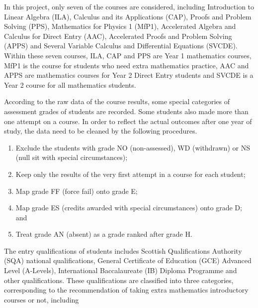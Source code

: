 \documentclass[a4paper]{report}
\begin{document}
In this project, only seven of the courses are considered, including Introduction to Linear Algebra (ILA), Calculus and its Applications (CAP), Proofs and Problem Solving (PPS), Mathematics for Physics 1 (MfP1), Accelerated Algebra and Calculus for Direct Entry (AAC), Accelerated Proofs and Problem Solving (APPS) and Several Variable Calculus and Differential Equations (SVCDE). Within these seven courses, ILA, CAP and PPS are Year 1 mathematics courses, MfP1 is the course for students who need extra mathematics practice, AAC and APPS are mathematics courses for Year 2 Direct Entry students and SVCDE is a Year 2 course for all mathematics students. 

According to the raw data of the course results, some special categories of assessment grades of students are recorded. Some students also made more than one attempt on a course. In order to reflect the actual outcomes after one year of study, the data need to be cleaned by the following procedures. 

\begin{enumerate}
\item Exclude the students with grade NO (non-assessed), WD (withdrawn) or NS (null sit with special circumstances); 
\item Keep only the results of the very first attempt in a course for each student; 
\item Map grade FF (force fail) onto grade E; 
\item Map grade ES (credits awarded with special circumstances) onto grade D; and
\item Treat grade AN (absent) as a grade ranked after grade H. 
\end{enumerate}

The entry qualifications of students includes Scottish Qualifications Authority (SQA) national qualifications, General Certificate of Education (GCE) Advanced Level (A-Levels), International Baccalaureate (IB) Diploma Programme and other qualifications. These qualifications are classified into three categories, corresponding to the recommendation of taking extra mathematics introductory courses or not, including
\end{document}
